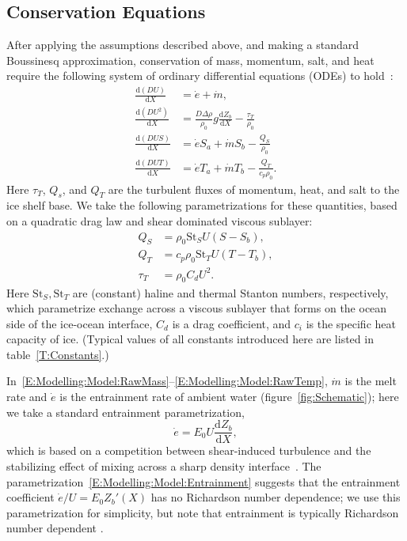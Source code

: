 \documentclass[openacc]{rsproca_new}%
\newcommand{\dd}[2]{\frac{\mathrm{d} #1}{\mathrm{d} #2}}
\begin{document}
\subsection{Conservation Equations} 
After applying the assumptions described above, and making a standard Boussinesq approximation, conservation of mass, momentum, salt, and heat require the following system of ordinary differential equations (ODEs) to hold~\citep{Jenkins2011JPhysOcean,Magorrian2016JGeoResOcean}:
\begin{align}
\dd{(DU)}{X} &= \dot{e} + \dot{m},\label{E:Modelling:Model:RawMass}\\
\dd{(DU^2)}{X} &= \frac{D\Delta \rho}{\rho_0} g \dd{Z_b}{X}  -\frac{\tau_T}{\rho_0}\label{E:Modelling:Model:RawMometum}\\
\dd{(DUS)}{X} &= \dot{e}S_a + \dot{m}S_b -\frac{Q_S}{\rho_0}\label{E:Modelling:Model:RawSalt}\\
\dd{(DUT)}{X} &= \dot{e}T_a + \dot{m}T_b -\frac{Q_T}{c_p \rho_0}.\label{E:Modelling:Model:RawTemp}
\end{align}
Here $\tau_T$, $Q_s$, and $Q_T$ are the turbulent fluxes of momentum, heat, and salt to the ice shelf base. We take the following parametrizations for these quantities, based on a quadratic drag law and shear dominated viscous sublayer:
\begin{align}
Q_S &= \rho_0 \mathrm{St}_S U (S - S_b),\label{E:Modelling:Model:TurbulentSalt} \\
Q_T &= c_p \rho_0 \mathrm{St}_T U (T -T_b),\label{E:Modelling:Model:TurbulentHeat}\\
 \tau_T &= \rho_0 C_d U^2.\label{E:Modelling:Model:TurbulentShear}
\end{align}
Here $\mathrm{St}_S, \mathrm{St}_T$ are (constant) haline and thermal Stanton numbers, respectively, which parametrize exchange across a viscous sublayer that forms on the ocean side of the ice-ocean interface, $C_d$ is a drag coefficient, and $c_i$ is the specific heat capacity of ice. (Typical values of all constants introduced here are listed in table~\ref{T:Constants}.)

In~\eqref{E:Modelling:Model:RawMass}--\eqref{E:Modelling:Model:RawTemp}, $\dot{m}$ is the melt rate and $\dot{e}$ is the entrainment rate of ambient water (figure~\ref{fig:Schematic}); here we take a standard entrainment parametrization, 
\begin{equation}\label{E:Modelling:Model:Entrainment}
\dot{e} = E_0 U \dd{Z_b}{X},
\end{equation}
which is based on a competition between shear-induced turbulence and the stabilizing effect of mixing across a sharp density interface~\citep{Pedersen1980,Turner1986JFM}. The parametrization~\eqref{E:Modelling:Model:Entrainment} suggests that the entrainment coefficient $\dot{e}/U = E_0 Z_b'(X)$ has no Richardson number dependence; we use this parametrization for simplicity, but note that entrainment is typically Richardson number dependent \cite[see][for example]{Holland2007JGeophysResOceans}.
\end{document}
